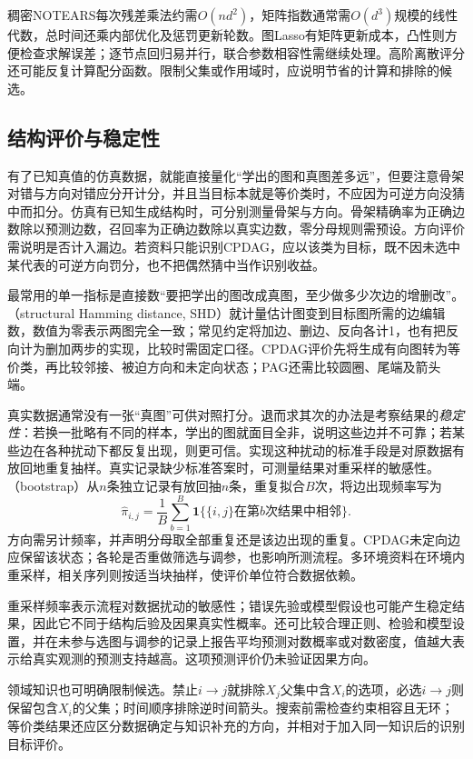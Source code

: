 稠密NOTEARS每次残差乘法约需$O(nd^2)$，矩阵指数通常需$O(d^3)$规模的线性代数，总时间还乘内部优化及惩罚更新轮数。图Lasso有矩阵更新成本，凸性则方便检查求解误差；逐节点回归易并行，联合参数相容性需继续处理。高阶离散评分还可能反复计算配分函数。限制父集或作用域时，应说明节省的计算和排除的候选。

\subsection{结构评价与稳定性}
\label{sec:pgm-structure-learning-evaluation}

有了已知真值的仿真数据，就能直接量化“学出的图和真图差多远”，但要注意骨架对错与方向对错应分开计分，并且当目标本就是等价类时，不应因为可逆方向没猜中而扣分。仿真有已知生成结构时，可分别测量骨架与方向。骨架精确率为正确边数除以预测边数，召回率为正确边数除以真实边数，零分母规则需预设。方向评价需说明是否计入漏边。若资料只能识别CPDAG，应以该类为目标，既不因未选中某代表的可逆方向罚分，也不把偶然猜中当作识别收益。

最常用的单一指标是直接数“要把学出的图改成真图，至少做多少次边的增删改”。（structural Hamming distance, SHD）就计量估计图变到目标图所需的边编辑数，数值为零表示两图完全一致；常见约定将加边、删边、反向各计1，也有把反向计为删加两步的实现，比较时需固定口径。CPDAG评价先将生成有向图转为等价类，再比较邻接、被迫方向和未定向状态；PAG还需比较圆圈、尾端及箭头端。

真实数据通常没有一张“真图”可供对照打分。退而求其次的办法是考察结果的\emph{稳定性}：若换一批略有不同的样本，学出的图就面目全非，说明这些边并不可靠；若某些边在各种扰动下都反复出现，则更可信。实现这种扰动的标准手段是对原数据有放回地重复抽样。真实记录缺少标准答案时，可测量结果对重采样的敏感性。（bootstrap）从$n$条独立记录有放回抽$n$条，重复拟合$B$次，将边出现频率写为
\[
  \widehat\pi_{i,j}
  =\frac1B\sum_{b=1}^{B}
       \mathbf{1}\{\{i,j\}\text{在第}b\text{次结果中相邻}\}.
\]
方向需另计频率，并声明分母取全部重复还是该边出现的重复。CPDAG未定向边应保留该状态；各轮是否重做筛选与调参，也影响所测流程。多环境资料在环境内重采样，相关序列则按适当块抽样，使评价单位符合数据依赖。

重采样频率表示流程对数据扰动的敏感性；错误先验或模型假设也可能产生稳定结果，因此它不同于结构后验及因果真实性概率。还可比较合理正则、检验和模型设置，并在未参与选图与调参的记录上报告平均预测对数概率或对数密度，值越大表示给真实观测的预测支持越高。这项预测评价仍未验证因果方向。

领域知识也可明确限制候选。禁止$i\to j$就排除$X_j$父集中含$X_i$的选项，必选$i\to j$则保留包含$X_i$的父集；时间顺序排除逆时间箭头。搜索前需检查约束相容且无环；等价类结果还应区分数据确定与知识补充的方向，并相对于加入同一知识后的识别目标评价。

